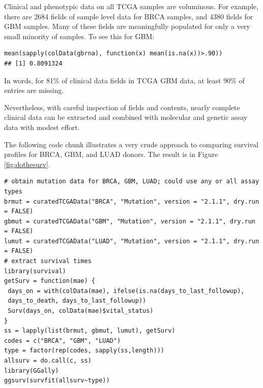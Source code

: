 Clinical and phenotypic data on all TCGA samples are voluminous. For example,
there are 2684 fields of sample level data for BRCA
samples, and 4380 fields for GBM samples. Many of these
fields are meaningfully populated for only a very small minority of samples.
To see this for GBM:


\begin{shaded}
\begin{verbatim}
mean(sapply(colData(gbrna), function(x) mean(is.na(x))>.90))
## [1] 0.8091324
\end{verbatim}
\end{shaded}

In words, for 81\% of clinical data fields in TCGA GBM data,
at least 90\% of entries are missing.

Nevertheless, with careful inspection of fields and contents,
nearly complete clinical data can be extracted and combined with molecular
and genetic assay data with modest effort.

The following code chunk illustrates a very crude
approach to comparing survival profiles for BRCA, GBM, and LUAD
donors. The result is in Figure \ref{fig:dothesurv}.


{\small
\begin{shaded}
\begin{verbatim}
# obtain mutation data for BRCA, GBM, LUAD; could use any or all assay types
brmut = curatedTCGAData("BRCA", "Mutation", version = "2.1.1", dry.run = FALSE)
gbmut = curatedTCGAData("GBM", "Mutation", version = "2.1.1", dry.run = FALSE)
lumut = curatedTCGAData("LUAD", "Mutation", version = "2.1.1", dry.run = FALSE)
# extract survival times
library(survival)
getSurv = function(mae) {
 days_on = with(colData(mae), ifelse(is.na(days_to_last_followup),
 days_to_death, days_to_last_followup))
 Surv(days_on, colData(mae)$vital_status)
}
ss = lapply(list(brmut, gbmut, lumut), getSurv)
codes = c("BRCA", "GBM", "LUAD")
type = factor(rep(codes, sapply(ss,length)))
allsurv = do.call(c, ss)
library(GGally)
ggsurv(survfit(allsurv~type))
\end{verbatim}
\end{shaded}
}

